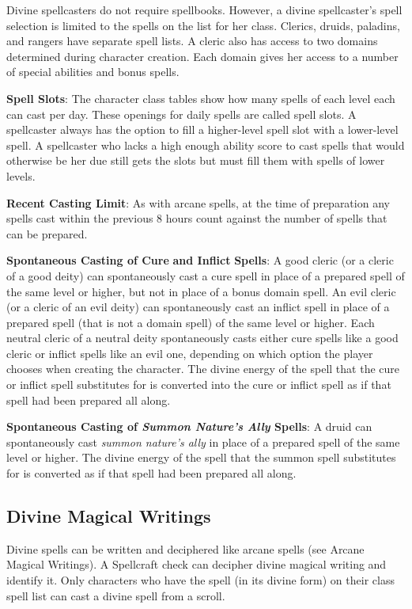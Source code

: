 Divine spellcasters do not require spellbooks. However, a divine spellcaster's spell selection is limited to the spells on the list for her class. Clerics, druids, paladins, and rangers have separate spell lists. A cleric also has access to two domains determined during character creation. Each domain gives her access to a number of special abilities and bonus spells.
				
\textbf{Spell Slots}: The character class tables show how many spells of each level each can cast per day. These openings for daily spells are called spell slots. A spellcaster always has the option to fill a higher-level spell slot with a lower-level spell. A spellcaster who lacks a high enough ability score to cast spells that would otherwise be her due still gets the slots but must fill them with spells of lower levels. 
				
\textbf{Recent Casting Limit}: As with arcane spells, at the time of preparation any spells cast within the previous 8 hours count against the number of spells that can be prepared.
				
\textbf{Spontaneous Casting of Cure} \textbf{and Inflict} \textbf{Spells}: A good cleric (or a cleric of a good deity) can spontaneously cast a cure spell in place of a prepared spell of the same level or higher, but not in place of a bonus domain spell. An evil cleric (or a cleric of an evil deity) can spontaneously cast an inflict spell in place of a prepared spell (that is not a domain spell) of the same level or higher. Each neutral cleric of a neutral deity spontaneously casts either cure spells like a good cleric or inflict spells like an evil one, depending on which option the player chooses when creating the character. The divine energy of the spell that the cure or inflict spell substitutes for is converted into the cure or inflict spell as if that spell had been prepared all along.
				
\textbf{Spontaneous Casting of  \textit{Summon Nature's Ally } Spells}: A druid can spontaneously cast \textit{summon nature's ally }in place of a prepared spell of the same level or higher. The divine energy of the spell that the summon spell substitutes for is converted as if that spell had been prepared all along.
				
\subsection{Divine Magical Writings}

				
Divine spells can be written and deciphered like arcane spells (see Arcane Magical Writings). A Spellcraft check can decipher divine magical writing and identify it. Only characters who have the spell (in its divine form) on their class spell list can cast a divine spell from a scroll.
				
